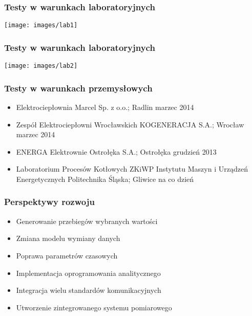\documentclass[ucs]{beamer}
\begin{document}
\begin{frame}
\frametitle{Testy w warunkach laboratoryjnych}
\begin{center}
\texttt{[image: images/lab1]}
\end{center}
\end{frame}

\begin{frame}
\frametitle{Testy w warunkach laboratoryjnych}
\begin{center}
\texttt{[image: images/lab2]}
\end{center}
\end{frame}

\begin{frame}
\frametitle{Testy w warunkach przemysłowych}
\begin{itemize}
\setlength{\itemsep}{5pt}
\setlength{\parskip}{5pt}
\setlength{\parsep}{5pt}
\item Elektrociepłownia Marcel Sp. z o.o.; Radlin marzec 2014
\item Zespół Elektrociepłowni Wrocławskich KOGENERACJA S.A.; Wrocław marzec 2014
\item ENERGA Elektrownie Ostrołęka S.A.; Ostrołęka grudzień 2013
\item Laboratorium Procesów Kotłowych ZKiWP Instytutu Maszyn i Urządzeń Energetycznych Politechnika Śląska; Gliwice na co dzień
\end{itemize}
\end{frame}

\begin{frame}
\frametitle{Perspektywy rozwoju}
\begin{itemize}
\setlength{\itemsep}{5pt}
\setlength{\parskip}{5pt}
\setlength{\parsep}{5pt}
\item Generowanie przebiegów wybranych wartości
\item Zmiana modelu wymiany danych
\item Poprawa parametrów czasowych
\item Implementacja oprogramowania analitycznego
\item Integracja wielu standardów komunikacyjnych
\item Utworzenie zintegrowanego systemu pomiarowego
\end{itemize}
\end{frame}
\end{document}
